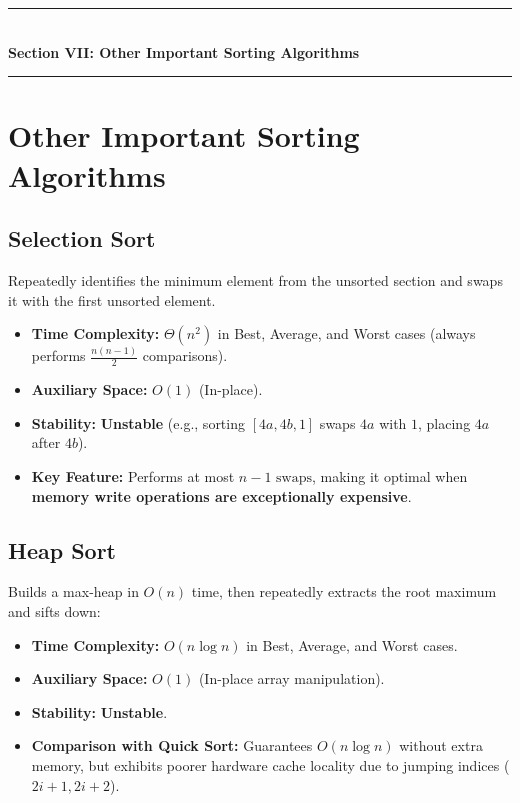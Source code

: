 \newpage
\begin{center}
\vspace{0.5em}
{\color{primary}\rule{0.45\textwidth}{1.2pt}}\\[4pt]
{\Large\bfseries\color{primary} Section VII: Other Important Sorting Algorithms}\\[2pt]
{\color{primary}\rule{0.45\textwidth}{1.2pt}}
\vspace{0.5em}
\end{center}

\section{Other Important Sorting Algorithms}

\subsection{Selection Sort}
Repeatedly identifies the minimum element from the unsorted section and swaps it with the first unsorted element.
\begin{itemize}
    \item \textbf{Time Complexity:} $\boxed{\Theta(n^2)}$ in Best, Average, and Worst cases (always performs $\frac{n(n-1)}{2}$ comparisons).
    \item \textbf{Auxiliary Space:} $O(1)$ (In-place).
    \item \textbf{Stability:} \textbf{Unstable} (e.g., sorting $[4a, 4b, 1]$ swaps $4a$ with $1$, placing $4a$ after $4b$).
    \item \textbf{Key Feature:} Performs at most $\boxed{n - 1 \text{ swaps}}$, making it optimal when \textbf{memory write operations are exceptionally expensive}.
\end{itemize}

\subsection{Heap Sort}
Builds a max-heap in $O(n)$ time, then repeatedly extracts the root maximum and sifts down:
\begin{itemize}
    \item \textbf{Time Complexity:} $\boxed{O(n \log n)}$ in Best, Average, and Worst cases.
    \item \textbf{Auxiliary Space:} $\boxed{O(1)}$ (In-place array manipulation).
    \item \textbf{Stability:} \textbf{Unstable}.
    \item \textbf{Comparison with Quick Sort:} Guarantees $O(n \log n)$ without extra memory, but exhibits poorer hardware cache locality due to jumping indices ($2i + 1, 2i + 2$).
\end{itemize}

